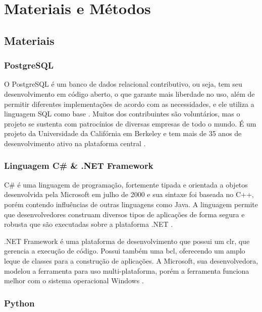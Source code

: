 \chapter{Materiais e Métodos}\label{cap:materialemetodos}

\section{Materiais}\label{sec:materiais}

\subsection{PostgreSQL}\label{subsec:postgresql}

O PostgreSQL é um banco de dados relacional contributivo, ou seja, tem seu desenvolvimento em código aberto, o que garante mais liberdade no uso, além de permitir diferentes implementações de acordo com as necessidades, e ele utiliza a linguagem SQL como base \cite{Amazon}. Muitos dos contribuintes são voluntários, mas o projeto se sustenta com patrocínios de diversas empresas de todo o mundo. É um projeto da Universidade da Califórnia em Berkeley e tem mais de 35 anos de desenvolvimento ativo na plataforma central \cite{PostgreSQL}.

\subsection{Linguagem C{\#} {\&} .NET Framework}\label{subsec:csharp}

C{\#} é uma linguagem de programação, fortemente tipada e orientada a objetos desenvolvida pela Microsoft em julho de 2000 e sua sintaxe foi baseada no C++, porém contendo influências de outras linguagens como Java. A linguagem permite que desenvolvedores construam diversos tipos de aplicações de forma segura e robusta que são executadas sobre a plataforma .NET \cite{CSharp}.

.NET Framework é uma plataforma de desenvolvimento que possui um \gls{clr}, que gerencia a execução de código. Possui também uma \gls{bcl}, oferecendo um amplo leque de classes para a construção de aplicações. A Microsoft, sua desenvolvedora, modelou a ferramenta para uso multi-plataforma, porém a ferramenta funciona melhor com o sistema operacional Windows \cite{CSharpDevelopment}.

\subsection{Python}\label{subsec:python}

